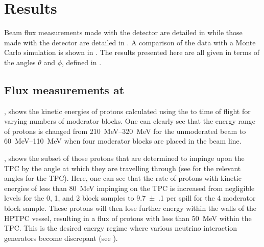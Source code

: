 \section{Results}
\label{sec:hptpc_beam_flux:results}

Beam flux measurements made with the \SThree detector are detailed in  while those made with the \SFour detector are detailed in .
A comparison of the data with a Monte Carlo simulation is shown in .
The results presented here are all given in terms of the angles $\theta$ and $\phi$, defined in .

\subsection{Flux measurements at \SThree}
\label{sec:hptpc_beam_flux:results:s3}

, shows the kinetic energies of protons calculated using the \SOne to \SThree time of flight for varying numbers of moderator blocks.
One can clearly see that the energy range of protons is changed from \SIrange{210}{320}{\mega\electronvolt} for the unmoderated beam to \SIrange{60}{110}{\mega\electronvolt} when four moderator blocks are placed in the beam line.

, shows the subset of those protons that are determined to impinge upon the TPC by the angle at which they are travelling through \SThree (see  for the relevant angles for the TPC).
Here, one can see that the rate of protons with kinetic energies of less than \SI{80}{\mega\electronvolt} impinging on the TPC is increased from negligible levels for the 0, 1, and 2 block samples to \num{9.7(1)} per spill for the 4 moderator block sample.
These protons will then lose further energy within the walls of the HPTPC vessel, resulting in a flux of protons with less than \SI{50}{\mega\electronvolt} within the TPC.
This is the desired energy regime where various neutrino interaction generators become discrepant (see ).

